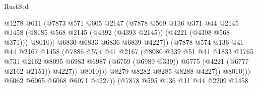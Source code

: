\begin{lexlean}{RustStd}
\begin{coremodule}
{\begin{coremodule}
{{{{{{{{{{{{{{{{{{{{{{{{{{{{{{{                                  @1278
                                  @611
                                  (@7873
                                    @571
                                    @605
                                    @2147
                                    (@7878
                                      @569
                                      @136
                                      @371
                                      @44
                                      @2145
                                      @1458
                                      (@8185
                                        @568
                                        @2145
                                        (@4392 (@4393 @2145))
                                        (@4221 (@4398 @568 @371)))
                                      @8010))
                                  @6830
                                  @6833
                                  @6836
                                  @6839
                                  @4227))
                              (@7878
                                @574
                                @136
                                @41
                                @44
                                @2167
                                @1458
                                (@7886
                                  @574
                                  @41
                                  @2167
                                  (@8080
                                    @339
                                    @51
                                    @41
                                    @1833
                                    @1765
                                    @731
                                    @2162
                                    @8095
                                    @6983
                                    @6987
                                    (@6759 (@6989 @339))
                                    @6775
                                    (@4221 (@6777 @2162 @2151))
                                    @4227))
                                @8010)))
                          @8279
                          @8282
                          @8285
                          @8288
                          @4227))
                      @8010)))
                @6062
                @6065
                @6068
                @6071
                @4227))
            (@7878
              @595
              @136
              @11
              @44
              @2209
              @1458
}}}}}}}}}}}}}}}}}}}}}}}}}}}}}}}
\end{coremodule}}
\end{coremodule}
\end{lexlean}
